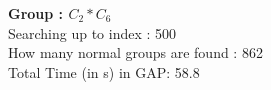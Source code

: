 \textbf{Group : $C_2*C_6$}\\
Searching up to index : 500\\
How many normal groups are found : 862\\
Total Time (in s) in GAP: 58.8\\
